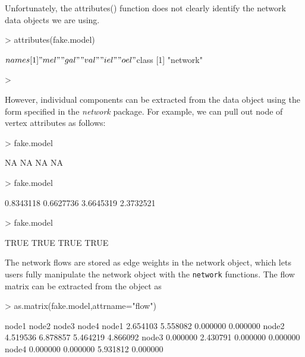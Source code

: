 \documentclass[article]{jss}
\begin{document}
Unfortunately, the attributes() function does not clearly identify the
network data objects we are using.

\begin{Schunk}
\begin{Sinput}
> attributes(fake.model)
\end{Sinput}
\begin{Soutput}
$names
[1] "mel" "gal" "val" "iel" "oel"

$class
[1] "network"
\end{Soutput}
\begin{Sinput}
> 
\end{Sinput}
\end{Schunk}

However, individual components can be extracted from the data object
using the form specified in the \textit{network} package.  For
example, we can pull out node of vertex attributes as follows:

\begin{Schunk}
\begin{Sinput}
> fake.model%
\end{Sinput}
\begin{Soutput}
[1] NA NA NA NA
\end{Soutput}
\begin{Sinput}
> fake.model%
\end{Sinput}
\begin{Soutput}
[1] 0.8343118 0.6627736 3.6645319 2.3732521
\end{Soutput}
\begin{Sinput}
> fake.model%
\end{Sinput}
\begin{Soutput}
[1] TRUE TRUE TRUE TRUE
\end{Soutput}
\end{Schunk}

The network flows are stored as edge weights in the network object,
which lets users fully manipulate the network object with the
\texttt{network} functions.  The flow matrix can be extracted from the
object as

\begin{Schunk}
\begin{Sinput}
> as.matrix(fake.model,attrname="flow")
\end{Sinput}
\begin{Soutput}
         node1    node2    node3    node4
node1 2.654103 5.558082 0.000000 0.000000
node2 4.519536 6.878857 5.464219 4.866092
node3 0.000000 2.430791 0.000000 0.000000
node4 0.000000 0.000000 5.931812 0.000000
\end{Soutput}
\end{Schunk}
\end{document}
